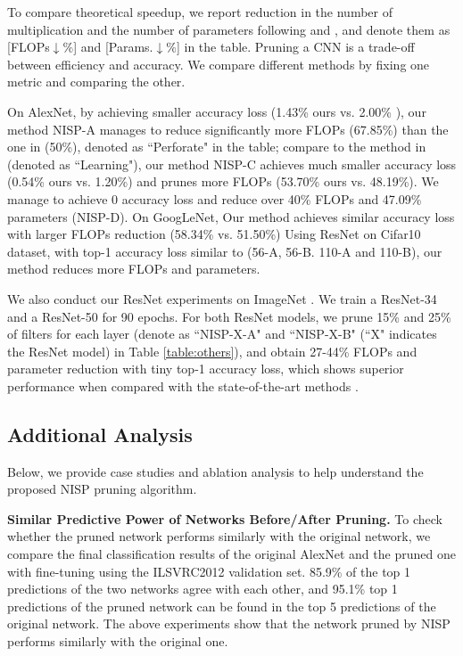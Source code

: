 \documentclass[10pt,twocolumn,letterpaper]{article}
\begin{document}
To compare theoretical speedup, we report reduction in the number of multiplication and the number of parameters following \cite{Tucker} and \cite{PerforatedCNN}, and denote them as [FLOPs$\downarrow$$\%$] and [Params.$\downarrow$$\%$] in the table. Pruning a CNN is a trade-off between efficiency and accuracy. We compare different methods by fixing one metric and comparing the other. 

On AlexNet, by achieving smaller accuracy loss (1.43\% ours vs. 2.00\% \cite{PerforatedCNN}), our method NISP-A manages to reduce significantly more FLOPs (67.85\%) than the one in \cite{PerforatedCNN} (50\%), denoted as ``Perforate" in the table; 
compare to the method in \cite{learning}  (denoted as ``Learning"), our method NISP-C achieves much smaller accuracy loss (0.54\% ours vs. 1.20\%) and prunes more FLOPs (53.70\% ours vs. 48.19\%). 
We manage to achieve 0 accuracy loss and reduce over 40\% FLOPs and 47.09\% parameters (NISP-D). 
On GoogLeNet, Our method achieves similar accuracy loss with larger FLOPs reduction (58.34\% vs. 51.50\%) 
Using ResNet on Cifar10 dataset, with top-1 accuracy loss similar to \cite{pruneweigth} (56-A, 56-B. 110-A and 110-B), our method reduces more FLOPs and parameters. 

We also conduct our ResNet experiments on ImageNet \cite{imagenet_cvpr09}. We train a ResNet-34 and a ResNet-50 for 90 epochs. 
For both ResNet models, we prune 15\% and 25\% of filters for each layer (denote as ``NISP-X-A" and ``NISP-X-B" (``X" indicates the ResNet model) in Table \ref{table:others}), and obtain 27-44\% FLOPs and parameter reduction with tiny top-1 accuracy loss, which shows superior performance when compared with the state-of-the-art methods \cite{pruneweigth,thinet}.

\subsection{Additional Analysis}
Below, we provide case studies and ablation analysis to help understand the proposed NISP pruning algorithm.

\textbf{Similar Predictive Power of Networks Before/After Pruning.} 
To check whether the pruned network performs similarly with the original network, we compare the final classification results of the original AlexNet and the pruned one with fine-tuning using the ILSVRC2012 validation set. 85.9\% of the top 1 predictions of the two networks agree with each other, and 95.1\% top 1 predictions of the pruned network can be found in the top 5 predictions of the original network.
The above experiments show that the network pruned by NISP performs similarly with the original one.
\end{document}
